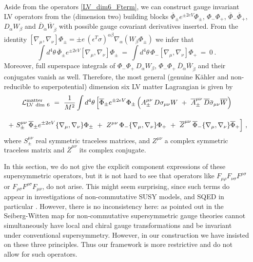 \documentclass[12pt]{revtex4}
\begin{document}
Aside from the operators \eqref{LV_dim6_Fterm}, we can 
construct gauge invariant LV operators from the (dimension two)
building blocks  
$\overline{\Phi}_\pm e^{\pm 2e V} \Phi_\pm$, $\Phi_- \Phi_+$, 
$\overline{\Phi}_- \overline{\Phi}_+$, $D_\alpha W_\beta$ and
$\overline{D}_{\dot\alpha} \overline{W}_{\dot\beta}$ with possible
gauge covariant derivatives inserted. From the identity 
\(
[ \nabla_\mu, \nabla_\nu] \Phi_\pm = \pm e \, 
(\epsilon^T \sigma)^{\alpha\beta} \nabla_\alpha( W_\beta \Phi_\pm)
\)
we infer that 
%
\begin{equation}
\int d^4\theta\, \overline{\Phi}_\pm e^{\pm 2eV} 
[ \nabla_\mu, \nabla_\nu] \Phi_\pm  
~=~ \int d^4\theta\, \Phi_- [ \nabla_\mu, \nabla_\nu] \Phi_+ ~=~ 0~. 
\end{equation} 
%
Moreover, full superspace integrals of 
$\Phi_- \Phi_+\, D_\alpha W_\beta$, 
$\Phi_- \Phi_+\, \overline{D}_{\dot\alpha} \overline{W}_{\dot\beta}$ 
and their conjugates vanish as well. Therefore, the most general
(genuine K\"ahler and non-reducible to superpotential) dimension six
LV matter Lagrangian is given by  
%
\begin{gather}
{\cal L}_{\rm LV\ dim\ 6}^{\rm matter}  ~=~ \frac{1}{M^2}
\int d^4 \theta\, \Big[ 
\overline{\Phi}_\pm e^{\pm 2eV} \Phi_\pm \, 
\Big( 
A_\pm^{\mu\nu} \, D \sigma_{\mu\nu} W ~+~ 
\overline{A}_\pm^{\mu\nu} \, \overline{D} \bar\sigma_{\mu\nu} \overline{W}
\Big) 
\nonumber \\[2ex]
~+~ S_\pm^{\mu\nu}\,  \overline{\Phi}_\pm e^{\pm 2eV} 
\lbrace \nabla_\mu, \nabla_\nu \rbrace \Phi_\pm  
~+~ Z^{\mu\nu}\,  \Phi_- \lbrace \nabla_\mu, \nabla_\nu \rbrace \Phi_+ 
~+~ \overline{Z}^{\mu\nu}\,  
\overline{\Phi}_- \lbrace \nabla_\mu, \nabla_\nu \rbrace \overline{\Phi}_+ 
 \Big]~, 
 \label{LV_dim6_Dterm}
\end{gather}
%
where $S_\pm^{\mu\nu}$ real symmetric traceless matrices, and 
$Z^{\mu\nu}$ a complex symmetric traceless matrix and
$\overline{Z}^{\mu\nu}$ its complex conjugate. 


In this section, we do not give the explicit component expressions of
these supersymmetric operators, but it is not hard to see that
operators like  $ F_{\mu\rho}F_{\nu\sigma}F^{\rho\sigma} $
or $ F_{\rho\sigma}F^{\rho\sigma}F_{\mu\nu} $, 
do not arise. This might seem surprising, since such terms do appear
in investigations of non-commutative SUSY models, and SQED in
particular \cite{Putz:2002ib,Mikulovic:2003sq}. However, there is no
inconsistency here: as pointed out in \cite{Mikulovic:2003sq} the
Seiberg-Witten map for non-commutative supersymmetric gauge 
theories cannot simultaneously have local and chiral gauge
transformations and be invariant under conventional supersymmetry. 
However, in our construction we have insisted on these three
principles. Thus our framework is more restrictive and do not allow 
for such operators. 
\end{document}
